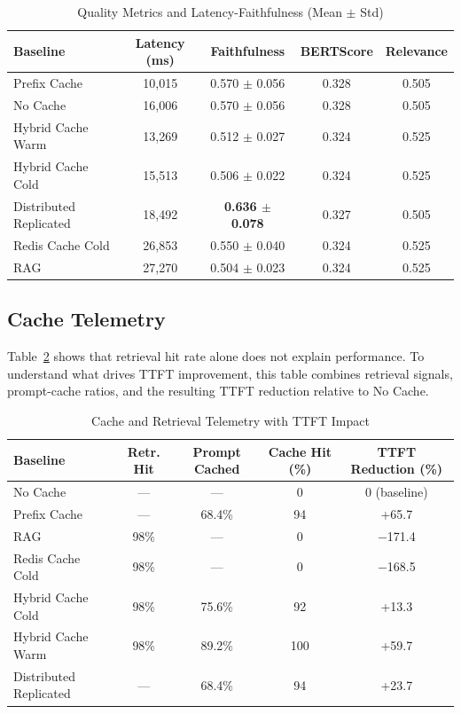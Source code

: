 \documentclass[12pt,a4paper]{article}
\begin{document}
\begin{table}[ht]
\centering
\caption{Quality Metrics and Latency-Faithfulness (Mean $\pm$ Std)}
\label{tab:quality}
\footnotesize
\begin{tabular}{@{}lcccc@{}}
\toprule
\textbf{Baseline} & \textbf{Latency (ms)} & \textbf{Faithfulness} & \textbf{BERTScore} & \textbf{Relevance} \\
\midrule
Prefix Cache & 10,015 & 0.570 $\pm$ 0.056 & 0.328 & 0.505 \\
No Cache & 16,006 & 0.570 $\pm$ 0.056 & 0.328 & 0.505 \\
Hybrid Cache Warm & 13,269 & 0.512 $\pm$ 0.027 & 0.324 & 0.525 \\
Hybrid Cache Cold & 15,513 & 0.506 $\pm$ 0.022 & 0.324 & 0.525 \\
Distributed Replicated & 18,492 & \textbf{0.636 $\pm$ 0.078} & 0.327 & 0.505 \\
Redis Cache Cold & 26,853 & 0.550 $\pm$ 0.040 & 0.324 & 0.525 \\
RAG & 27,270 & 0.504 $\pm$ 0.023 & 0.324 & 0.525 \\
\bottomrule
\end{tabular}
\end{table}

\subsection{Cache Telemetry}

Table~\ref{tab:cache} shows that retrieval hit rate alone does not explain performance. To understand what drives TTFT improvement, this table combines retrieval signals, prompt-cache ratios, and the resulting TTFT reduction relative to No Cache.

\begin{table}[H]
\centering
\caption{Cache and Retrieval Telemetry with TTFT Impact}
\label{tab:cache}
\footnotesize
\begin{tabular}{@{}lcccc@{}}
\toprule
\textbf{Baseline} & \textbf{Retr. Hit} & \textbf{Prompt Cached} & \textbf{Cache Hit (\%)} & \textbf{TTFT Reduction (\%)} \\
\midrule
No Cache & --- & --- & 0 & 0 (baseline) \\
Prefix Cache & --- & 68.4\% & 94 & +65.7 \\
RAG & 98\% & --- & 0 & $-$171.4 \\
Redis Cache Cold & 98\% & --- & 0 & $-$168.5 \\
Hybrid Cache Cold & 98\% & 75.6\% & 92 & +13.3 \\
Hybrid Cache Warm & 98\% & 89.2\% & 100 & +59.7 \\
Distributed Replicated & --- & 68.4\% & 94 & +23.7 \\
\bottomrule
\end{tabular}
\end{table}
\end{document}

